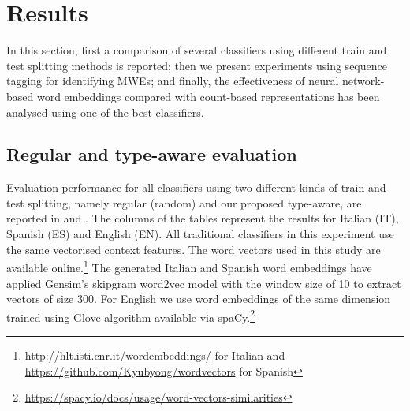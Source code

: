 \documentclass[output=paper
,modfonts
,nonflat]{langsci/langscibook}
\begin{document}

\section{Results}

In this section, first a comparison of several classifiers using different train and test splitting methods is reported; then we present experiments using sequence tagging for identifying MWEs; and finally, the effectiveness of neural network-based word embeddings compared with count-based representations has been analysed using one of the best classifiers.

\subsection{Regular and type-aware evaluation}
\label{sec:res1}
Evaluation performance for all classifiers using two different kinds of train and test splitting, namely regular (random) and our proposed type-aware, are reported in  and .
The columns of the tables represent the results for Italian (IT), Spanish (ES) and English (EN).
All traditional classifiers in this experiment use the same vectorised context features. 
The word vectors used in this study are available online.\footnote{\url{http://hlt.isti.cnr.it/wordembeddings/} for Italian and \url{https://github.com/Kyubyong/wordvectors} for Spanish} The generated Italian and Spanish word embeddings have applied Gensim’s skipgram word2vec model with the window size of 10 to extract vectors of size 300.
For English we use word embeddings of the same dimension trained using Glove \citep{pennington2014glove} algorithm available via spaCy.\footnote{\url{https://spacy.io/docs/usage/word-vectors-similarities}}
\end{document}
